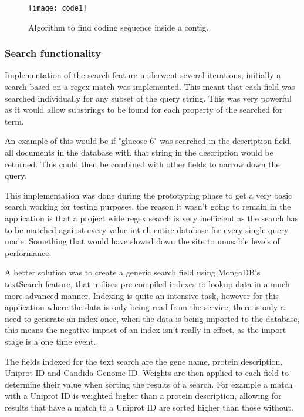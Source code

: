 \begin{figure}[H]
\begin{center}
\texttt{[image: code1]}
\caption{Algorithm to find coding sequence inside a contig. \label{overflow}}
\end{center}
\end{figure}

\subsubsection{Search functionality}
Implementation of the search feature underwent several iterations, initially a search based on a regex match was implemented. This meant that each field was searched individually for any subset of the query string. This was very powerful as it would allow substrings to be found for each property of the searched for term. 

An example of this would be if "glucose-6" was searched in the description field, all documents in the database with that string in the description would be returned. This could then be combined with other fields to narrow down the query. 

This implementation was done during the prototyping phase to get a very basic search working for testing purposes, the reason it wasn't going to remain in the application is that a project wide regex search is very inefficient as the search has to be matched against every value int eh entire database for every single query made. Something that would have slowed down the site to unusable levels of performance.

A better solution was to create a generic search field using MongoDB's textSearch\cite{textsearch} feature, that utilises pre-compiled indexes to lookup data in a much more advanced manner. Indexing is quite an intensive task, however for this application where the data is only being read from the service, there is only a need to generate an index once, when the data is being imported to the database, this means the negative impact of an index isn't really in effect, as the import stage is a one time event. 

The fields indexed for the text search are the gene name, protein description, Uniprot ID and Candida Genome ID. Weights are then applied to each field to determine their value when sorting the results of a search. For example a match with a Uniprot ID is weighted higher than a protein description, allowing for results that have a match to a Uniprot ID are sorted higher than those without.  


